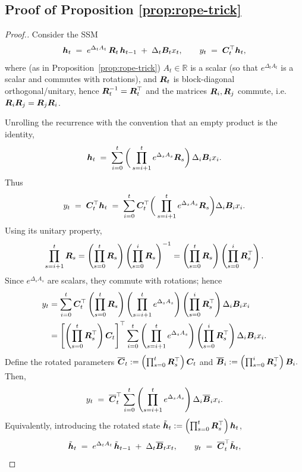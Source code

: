 \subsection{Proof of Proposition \ref{prop:rope-trick}}
\label{app:proof-rope-trick}
\PropRoPETrick*
\begin{proof}[Proof.]
Consider the SSM
\begin{equation}
    {\bm{h}}_t \;=\; e^{\Delta_t A_t}\,{\bm{R}}_t\,{\bm{h}}_{t-1} \;+\; \Delta_t{\bm{B}}_t x_t, 
    \qquad 
    y_t \;=\; {\bm{C}}_t^\top {\bm{h}}_t,
\end{equation}
where (as in Proposition~\ref{prop:rope-trick}) \(A_t\in\mathbb{R}\) is a scalar (so that \(e^{\Delta_t A_t}\) is a scalar and commutes with rotations), and \({\bm{R}}_t\) is block-diagonal orthogonal/unitary, hence \({\bm{R}}_t^{-1}={\bm{R}}_t^\top\) and the matrices ${\bm{R}}_i, {\bm{R}}_j$ commute, i.e. ${\bm{R}}_i{\bm{R}}_j={\bm{R}}_j{\bm{R}}_i$.

Unrolling the recurrence with the convention that an empty product is the identity,
\begin{equation}
    {\bm{h}}_t \;=\; \sum_{i=0}^{t} 
    \bigg(\prod_{s=i+1}^{t} e^{\Delta_s A_s}{\bm{R}}_s\bigg)\,\Delta_i{\bm{B}}_i x_i.
\end{equation}
Thus
\begin{align}
    y_t 
    \;=\; {\bm{C}}_t^\top {\bm{h}}_t
    \;=\; \sum_{i=0}^{t} {\bm{C}}_t^\top 
    \bigg(\prod_{s=i+1}^{t} e^{\Delta_s A_s}{\bm{R}}_s\bigg)\Delta_i{\bm{B}}_i x_i.
\end{align}
Using its unitary property,
\begin{align*}
    \prod_{s=i+1}^{t}{\bm{R}}_s 
    = \left(\prod_{s=0}^{t}{\bm{R}}_s\right)\left(\prod_{s=0}^{i}{\bm{R}}_s\right)^{-1}
    = \left(\prod_{s=0}^{t}{\bm{R}}_s\right)\left(\prod_{s=0}^{i}{\bm{R}}_s^\top\right).
\end{align*}
Since \(e^{\Delta_s A_s}\) are scalars, they commute with rotations; hence
\begin{align}
    y_t 
    &= \sum_{i=0}^{t} 
       {\bm{C}}_t^\top \left(\prod_{s=0}^{t}{\bm{R}}_s\right)
       \left(\prod_{s=i+1}^{t} e^{\Delta_s A_s}\right)
       \left(\prod_{s=0}^{i}{\bm{R}}_s^\top\right) \Delta_i {\bm{B}}_i x_i \\
    &= \left[\left(\prod_{s=0}^{t}{\bm{R}}_s^\top\right){\bm{C}}_t\right]^\top 
       \sum_{i=0}^{t} 
       \left(\prod_{s=i+1}^{t} e^{\Delta_s A_s}\right)
       \left(\prod_{s=0}^{i}{\bm{R}}_s^\top\right)\Delta_i {\bm{B}}_i x_i.
\end{align}
Define the rotated parameters
\(
\overline{{\bm{C}}}_t := \left(\prod_{s=0}^{t}{\bm{R}}_s^\top\right){\bm{C}}_t
\)
and
\(
\overline{{\bm{B}}}_i := \left(\prod_{s=0}^{i}{\bm{R}}_s^\top\right){\bm{B}}_i.
\)
Then,
\begin{equation}
    y_t \;=\; \overline{{\bm{C}}}_t^\top 
    \sum_{i=0}^{t} \left(\prod_{s=i+1}^{t} e^{\Delta_s A_s}\right)\Delta_i \overline{{\bm{B}}}_i x_i.
\end{equation}
Equivalently, introducing the rotated state \(\tilde{{\bm{h}}}_t := \left(\prod_{s=0}^{t}{\bm{R}}_s^\top\right){\bm{h}}_t\),
\begin{equation}
    \tilde{{\bm{h}}}_t \;=\; e^{\Delta_t A_t}\,\tilde{{\bm{h}}}_{t-1} \;+\; \Delta_t \overline{{\bm{B}}}_t x_t,
    \qquad
    y_t \;=\; \overline{{\bm{C}}}_t^\top \tilde{{\bm{h}}}_t,
\end{equation}
\end{proof}


